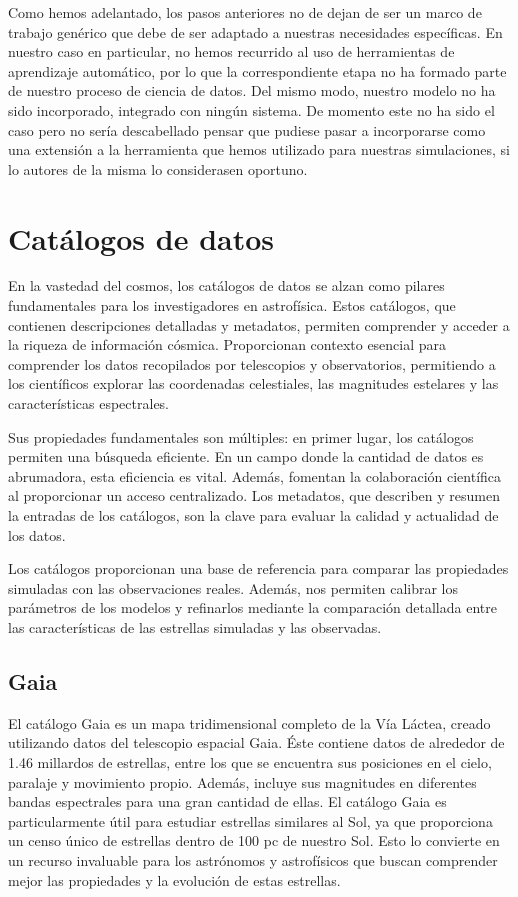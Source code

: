 Como hemos adelantado, los pasos anteriores no de dejan de ser un marco de trabajo genérico que debe de ser adaptado a nuestras necesidades específicas. En nuestro caso en particular, no hemos recurrido al uso de herramientas de aprendizaje automático, por lo que la correspondiente etapa no ha formado parte de nuestro proceso de ciencia de datos. Del mismo modo, nuestro modelo no ha sido incorporado, integrado con ningún sistema. De momento este no ha sido el caso pero no sería descabellado pensar que pudiese pasar a incorporarse como una extensión a la herramienta que hemos utilizado para nuestras simulaciones, si lo autores de la misma lo considerasen oportuno.


\section{Catálogos de datos}
En la vastedad del cosmos, los catálogos de datos se alzan como pilares fundamentales para los investigadores en astrofísica. Estos catálogos, que contienen descripciones detalladas y metadatos, permiten comprender y acceder a la riqueza de información cósmica. Proporcionan contexto esencial para comprender los datos recopilados por telescopios y observatorios, permitiendo a los científicos explorar las coordenadas celestiales, las magnitudes estelares y las características espectrales.\par

Sus propiedades fundamentales son múltiples: en primer lugar, los catálogos permiten una búsqueda eficiente. En un campo donde la cantidad de datos es abrumadora, esta eficiencia es vital. Además, fomentan la colaboración científica al proporcionar un acceso centralizado. Los metadatos, que describen y resumen la entradas de los catálogos, son la clave para evaluar la calidad y actualidad de los datos.\par

Los catálogos proporcionan una base de referencia para comparar las propiedades simuladas con las observaciones reales. Además, nos permiten calibrar los parámetros de los modelos y refinarlos mediante la comparación detallada entre las características de las estrellas simuladas y las observadas.\par


\subsection{Gaia}
El catálogo Gaia \citep{Mignard2005} es un mapa tridimensional completo de la Vía Láctea, creado utilizando datos del telescopio espacial Gaia. Éste contiene datos de alrededor de 1.46 millardos de estrellas, entre los que se encuentra sus posiciones en el cielo, paralaje y movimiento propio. Además, incluye sus magnitudes en diferentes bandas espectrales para una gran cantidad de ellas. El catálogo Gaia es particularmente útil para estudiar estrellas similares al Sol, ya que proporciona un censo único de estrellas dentro de 100 pc de nuestro Sol. Esto lo convierte en un recurso invaluable para los astrónomos y astrofísicos que buscan comprender mejor las propiedades y la evolución de estas estrellas.\par

